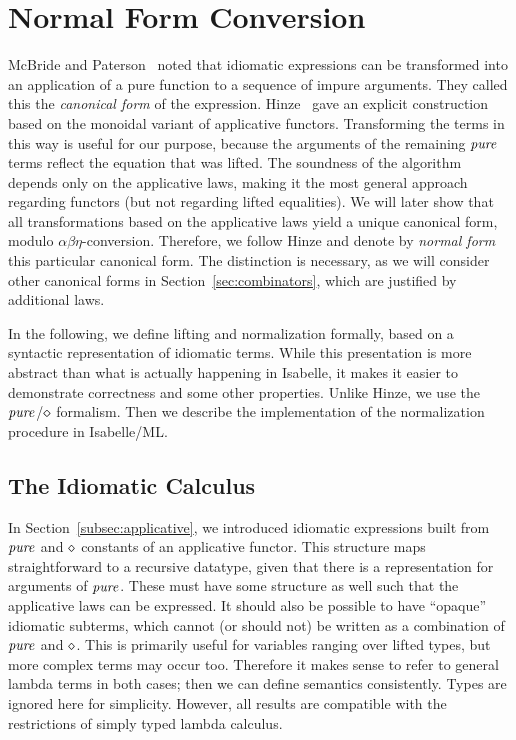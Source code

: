 \section{Normal Form Conversion}\label{sec:normal-form}

McBride and Paterson~\cite{mcbride08} noted that idiomatic expressions can
be transformed into an application of a pure function to a sequence of impure
arguments.
They called this the \emph{canonical form} of the expression.
Hinze~\cite[Section~3.3]{hinze10} gave an explicit construction based on the
monoidal variant of applicative functors.  %
Transforming the terms in this way is useful for our purpose, because the
arguments of the remaining $\operatorname{\mathit{pure}}$ terms reflect the equation that was lifted.
The soundness of the algorithm depends only on the applicative laws, making it
the most general approach regarding functors (but not regarding lifted
equalities).
We will later show that all transformations based on the applicative laws yield
a unique canonical form, modulo $\alpha\beta\eta$-conversion.
Therefore, we follow Hinze and denote by \emph{normal form} this particular
canonical form.
The distinction is necessary, as we will consider other canonical forms in
Section~\ref{sec:combinators}, which are justified by additional laws.

In the following, we define lifting and normalization formally, based on a
syntactic representation of idiomatic terms.
While this presentation is more abstract than what is actually happening in
Isabelle, it makes it easier to demonstrate correctness and some other
properties.
Unlike Hinze, we use the $\operatorname{\mathit{pure}}$/$\diamond$ formalism.
Then we describe the implementation of the normalization procedure in
Isabelle/ML.

\subsection{The Idiomatic Calculus}\label{subsec:idiomatic-calculus}

In Section~\ref{subsec:applicative}, we introduced idiomatic expressions built
from $\operatorname{\mathit{pure}}$ and $\diamond$ constants of an applicative functor.
This structure maps straightforward to a recursive datatype, given that there
is a representation for arguments of $\operatorname{\mathit{pure}}$.
These must have some structure as well such that the applicative laws can be
expressed.
It should also be possible to have ``opaque'' idiomatic subterms, which cannot
(or should not) be written as a combination of $\operatorname{\mathit{pure}}$ and $\diamond$.
This is primarily useful for variables ranging over lifted types, but more
complex terms may occur too.
Therefore it makes sense to refer to general lambda terms in both cases;
then we can define semantics consistently.
Types are ignored here for simplicity.
However, all results are compatible with the restrictions of simply typed
lambda calculus.

